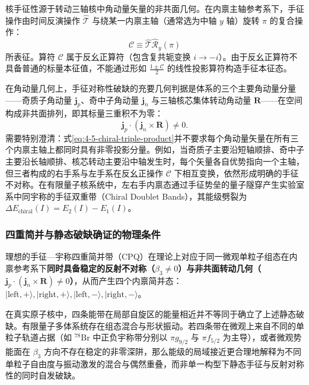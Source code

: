 核手征性源于转动三轴核中角动量矢量的非共面几何。在内禀主轴参考系下，手征操作由时间反演操作 $\hat{\mathcal{T}}$ 与绕某一内禀主轴（通常选为中轴 $y$ 轴）旋转 $\pi$ 的复合操作：
\begin{equation}\label{eq:4-5-chiral-op}
\mathcal{C} \equiv \hat{\mathcal{T}} \hat{\mathcal{R}}_y(\pi)
\end{equation}
所表征。算符 $\mathcal{C}$ 属于反幺正算符（包含复共轭变换 $i \to -i$）。由于反幺正算符不具备普通的标量本征值，不能通过形如 $\frac{1 \pm \mathcal{C}}{2}$ 的线性投影算符构造手征本征态。

在角动量几何上，手征对称性破缺的充要几何判据是体系的三个主要角动量分量——奇质子角动量 $\mathbf{j}_p$、奇中子角动量 $\mathbf{j}_n$ 与三轴核芯集体转动角动量 $\mathbf{R}$——在空间构成非共面排列，即其标量三重积不为零：
\begin{equation}\label{eq:4-5-chiral-triple-product}
\mathbf{j}_p \cdot (\mathbf{j}_n \times \mathbf{R}) \neq 0.
\end{equation}
需要特别澄清：式\eqref{eq:4-5-chiral-triple-product}并不要求每个角动量矢量在所有三个内禀主轴上都同时具有非零投影分量。例如，当奇质子主要沿短轴顺排、奇中子主要沿长轴顺排、核芯转动主要沿中轴发生时，每个矢量各自优势指向一个主轴，但三者构成的右手系与左手系在反幺正操作 $\mathcal{C}$ 下相互变换，依然形成明确的手征不对称。在有限量子核系统中，左右手内禀态通过手征势垒的量子隧穿产生实验室系中同宇称的手征双重带（Chiral Doublet Bands），其能级劈裂为 $\Delta E_{\text{chiral}}(I) = E_2(I) - E_1(I)$。

\subsubsection{四重简并与静态破缺确证的物理条件}

理想的手征---宇称四重简并带（CPQ）在理论上对应于同一微观单粒子组态在内禀参考系下\textbf{同时具备稳定的反射不对称（$\beta_3 \neq 0$）与非共面转动几何（$\mathbf{j}_p \cdot (\mathbf{j}_n \times \mathbf{R}) \neq 0$）}，从而产生四个内禀简并态：$|\text{left}, +\rangle, |\text{right}, +\rangle, |\text{left}, -\rangle, |\text{right}, -\rangle$。

在真实原子核中，四条能带在局部自旋区的能量相近并不等同于确立了上述静态破缺。有限量子多体系统存在组态混合与形状振动。若四条带在微观上来自不同的单粒子轨道占据（如 $^{78}\mathrm{Br}$ 中正负宇称带分别以 $\pi g_{9/2}$ 与 $\pi f_{5/2}$ 为主导），或者微观势能面在 $\beta_3$ 方向不存在稳定的非零深阱，那么能级的局域接近更合理地解释为不同单粒子自由度与振动激发的混合与偶然重叠，而非单一构型下静态手征与反射对称性的同时自发破缺。

